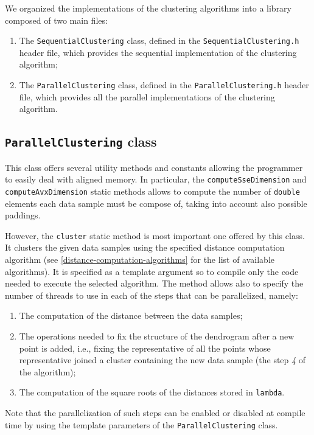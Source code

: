 \documentclass{article}
\begin{document}
We organized the implementations of the clustering algorithms into a library composed of two
main files:
\begin{enumerate}
    \item The \texttt{SequentialClustering} class, defined in the \texttt{SequentialClustering.h}
    header file, which provides the sequential implementation of the clustering algorithm;
    \item The \texttt{ParallelClustering} class, defined in the \texttt{ParallelClustering.h}
    header file, which provides all the parallel implementations of the clustering algorithm.
\end{enumerate}

\hypertarget{parallel-clustering}{%
    \subsection{\texttt{ParallelClustering} class}
    \label{parallel-clustering}}

This class offers several utility methods and constants allowing the programmer to easily deal
with aligned memory. In particular, the \texttt{computeSseDimension} and
\texttt{computeAvxDimension} static methods allows to compute the number of \texttt{double}
elements each data sample must be compose of, taking into account also possible paddings.

However, the \texttt{cluster} static method is most important one offered by this class. It clusters
the given data samples using the specified distance computation algorithm (see
\ref{distance-computation-algorithms} for the list of available algorithms).
It is specified as a template argument so to compile only the code needed to execute the selected
algorithm.
The method allows also to specify the number of threads to use in each of the steps that can be
parallelized, namely:
\begin{enumerate}
    \item The computation of the distance between the data samples;
    \item The operations needed to fix the structure of the dendrogram after a new point is
    added, i.e., fixing the representative of all the points whose representative joined a
    cluster containing the new data sample (the step \textit{4} of the algorithm);
    \item The computation of the square roots of the distances stored in \texttt{lambda}.
\end{enumerate}
Note that the parallelization of such steps can be enabled or disabled at compile time by using the
template parameters of the \texttt{ParallelClustering} class.
\end{document}
